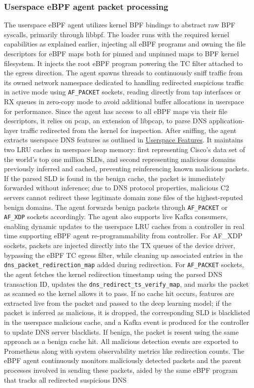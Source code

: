 \documentclass [11pt, proquest] {uwthesis}[2020/02/24]
\begin{document}
\subsubsection{\textbf{Userspace eBPF agent packet processing}}
\label{active:sec2}
The userspace eBPF agent utilizes kernel BPF bindings to abstract raw BPF syscalls, primarily through libbpf. The loader runs with the required kernel capabilities as explained earlier, injecting all eBPF programs and owning the file descriptors for eBPF maps both for pinned and unpinned maps to BPF kernel filesystem. It injects the root eBPF program powering the TC filter attached to the egress direction. The agent spawns threads to continuously sniff traffic from its owned network namespace dedicated to handling redirected suspicious traffic in active mode using \texttt{AF\_PACKET} sockets, reading directly from tap interfaces or RX queues in zero-copy mode to avoid additional buffer allocations in userspace for performance. Since the agent has access to all eBPF maps via their file descriptors, it relies on pcap, an extension of libpcap, to parse DNS application-layer traffic redirected from the kernel for inspection. After sniffing, the agent extracts userspace DNS features as outlined in \hyperref[sec:feature-userspace]{Userspace Features}. It maintains two LRU caches in userspace heap memory: first representing Cisco's data set of the world's top one million SLDs, and second representing malicious domains previously inferred and cached, preventing reinferencing known malicious packets. If the parsed SLD is found in the benign cache, the packet is immediately forwarded without inference; due to DNS protocol properties, malicious C2 servers cannot redirect these legitimate domain zone files of the highest-reputed benign domains. The agent forwards benign packets through \texttt{AF\_PACKET} or \texttt{AF\_XDP} sockets accordingly. The agent also supports live Kafka consumers, enabling dynamic updates to the userspace LRU caches from a controller in real time supporting eBPF agent re-programmability from controller. For AF\_XDP sockets, packets are injected directly into the TX queues of the device driver, bypassing the eBPF TC egress filter, while cleaning up associated entries in the \texttt{dns\_packet\_redirection\_map} added during redirection. For \texttt{AF\_PACKET} sockets, the agent fetches the kernel redirection timestamp using the parsed DNS transaction ID, updates the \texttt{dns\_redirect\_ts\_verify\_map}, and marks the packet as scanned so the kernel allows it to pass. If no cache hit occurs, features are extracted live from the packet and passed to the deep learning model; if the packet is inferred as malicious, it is dropped, the corresponding SLD is blacklisted in the userspace malicious cache, and a Kafka event is produced for the controller to update DNS server blacklists. If benign, the packet is resent using the same approach as a benign cache hit. All malicious detection events are exported to Prometheus along with system observability metrics like redirection counts. The eBPF agent continuously monitors maliciously detected packets and the parent processes involved in sending these packets, aided by the same eBPF program that tracks all redirected suspicious DNS 
\end{document}

